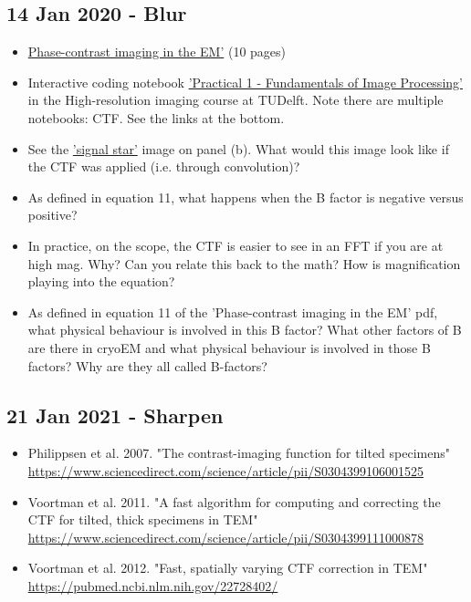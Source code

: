 \documentclass[11pt, oneside]{article}   	%
\begin{document}
\subsection{14 Jan 2020 - Blur}
\begin{itemize}
	\item \href{https://cryoemprinciples.yale.edu/sites/default/files/files/2%20Phase%20contrast.pdf}{Phase-contrast imaging in the EM'} (10 pages)
	\item Interactive coding notebook \href{https://gitlab.tudelft.nl/aj-lab/teaching/-/wikis/NB4020}{'Practical 1 - Fundamentals of Image Processing'} in the High-resolution imaging course at TUDelft. Note there are multiple notebooks: CTF. See the links at the bottom.
\end{itemize}
\begin{itemize}
	\item See the  \href{https://static5.olympus-lifescience.com/data/olympusmicro/primer/images/mtf/modulationfigure6.jpg?rev=480E}{'signal star'} image on panel (b).
What would this image look like if the CTF was applied (i.e. through convolution)?
	\item As defined in equation 11, what happens when the B factor is negative versus positive?
	\item In practice, on the scope, the CTF is easier to see in an FFT if you are at high mag. Why? Can you relate this back to the math? How is magnification playing into the equation?
	\item As defined in equation 11 of the 'Phase-contrast imaging in the EM' pdf, what physical behaviour is involved in this B factor? What other factors of B are there in cryoEM and what physical behaviour is involved in those B factors? Why are they all called B-factors?
\end{itemize}

\pagebreak
\subsection{21 Jan 2021 - Sharpen}
\begin{itemize}
	\item  Philippsen et al. 2007. "The contrast-imaging function for tilted specimens" \url{https://www.sciencedirect.com/science/article/pii/S0304399106001525}
	\item Voortman et al. 2011. "A fast algorithm for computing and correcting the CTF for tilted, thick specimens in TEM" \url{https://www.sciencedirect.com/science/article/pii/S0304399111000878}
	\item Voortman et al. 2012. "Fast, spatially varying CTF correction in TEM" \url{https://pubmed.ncbi.nlm.nih.gov/22728402/}	
\end{itemize}
\end{document}
